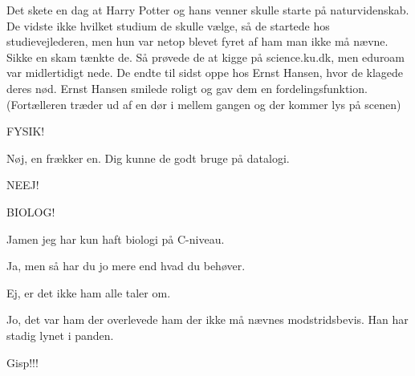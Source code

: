 \documentclass[a4paper,11pt]{article}
\begin{document}
\begin{sketch}


 Det skete en dag at Harry Potter og hans venner skulle starte på naturvidenskab. De vidste ikke hvilket studium de skulle vælge, så de startede hos studievejlederen, men hun var netop blevet fyret af ham man ikke må nævne. Sikke en skam tænkte de. Så prøvede de at kigge på science.ku.dk, men eduroam var midlertidigt nede. De endte til sidst oppe hos Ernst Hansen, hvor de klagede deres nød. Ernst Hansen smilede roligt og gav dem en fordelingsfunktion. (Fortælleren træder ud af en dør i mellem gangen og der kommer lys på scenen)



 FYSIK!


 Nøj, en frækker en. Dig kunne de godt bruge på datalogi.

 NEEJ!


 BIOLOG!

 Jamen jeg har kun haft biologi på C-niveau.

 Ja, men så har du jo mere end hvad du behøver.


 Ej, er det ikke ham alle taler om.

 Jo, det var ham der overlevede ham der ikke må nævnes modstridsbevis. Han har stadig lynet i panden.

 Gisp!!!


\end{sketch}
\end{document}
